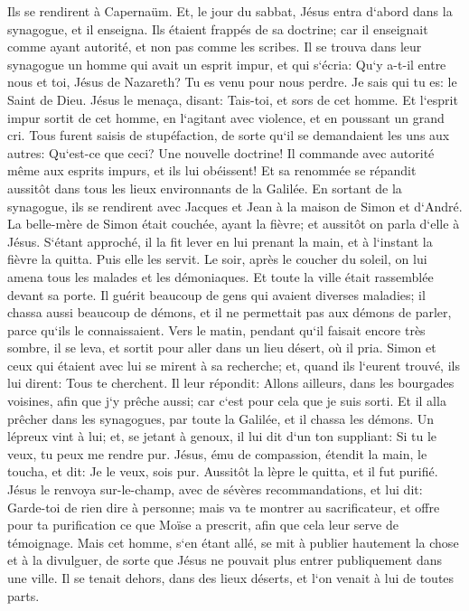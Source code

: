 \verse Ils se rendirent à Capernaüm. Et, le jour du sabbat, Jésus entra d`abord dans la synagogue, et il enseigna. 
\verse Ils étaient frappés de sa doctrine; car il enseignait comme ayant autorité, et non pas comme les scribes. 
\verse Il se trouva dans leur synagogue un homme qui avait un esprit impur, et qui s`écria: 
\verse Qu`y a-t-il entre nous et toi, Jésus de Nazareth? Tu es venu pour nous perdre. Je sais qui tu es: le Saint de Dieu. 
\verse Jésus le menaça, disant: Tais-toi, et sors de cet homme. 
\verse Et l`esprit impur sortit de cet homme, en l`agitant avec violence, et en poussant un grand cri. 
\verse Tous furent saisis de stupéfaction, de sorte qu`il se demandaient les uns aux autres: Qu`est-ce que ceci? Une nouvelle doctrine! Il commande avec autorité même aux esprits impurs, et ils lui obéissent! 
\verse Et sa renommée se répandit aussitôt dans tous les lieux environnants de la Galilée. 
\verse En sortant de la synagogue, ils se rendirent avec Jacques et Jean à la maison de Simon et d`André. 
\verse La belle-mère de Simon était couchée, ayant la fièvre; et aussitôt on parla d`elle à Jésus. 
\verse S`étant approché, il la fit lever en lui prenant la main, et à l`instant la fièvre la quitta. Puis elle les servit. 
\verse Le soir, après le coucher du soleil, on lui amena tous les malades et les démoniaques. 
\verse Et toute la ville était rassemblée devant sa porte. 
\verse Il guérit beaucoup de gens qui avaient diverses maladies; il chassa aussi beaucoup de démons, et il ne permettait pas aux démons de parler, parce qu`ils le connaissaient. 
\verse Vers le matin, pendant qu`il faisait encore très sombre, il se leva, et sortit pour aller dans un lieu désert, où il pria. 
\verse Simon et ceux qui étaient avec lui se mirent à sa recherche; 
\verse et, quand ils l`eurent trouvé, ils lui dirent: Tous te cherchent. 
\verse Il leur répondit: Allons ailleurs, dans les bourgades voisines, afin que j`y prêche aussi; car c`est pour cela que je suis sorti. 
\verse Et il alla prêcher dans les synagogues, par toute la Galilée, et il chassa les démons. 
\verse Un lépreux vint à lui; et, se jetant à genoux, il lui dit d`un ton suppliant: Si tu le veux, tu peux me rendre pur. 
\verse Jésus, ému de compassion, étendit la main, le toucha, et dit: Je le veux, sois pur. 
\verse Aussitôt la lèpre le quitta, et il fut purifié. 
\verse Jésus le renvoya sur-le-champ, avec de sévères recommandations, 
\verse et lui dit: Garde-toi de rien dire à personne; mais va te montrer au sacrificateur, et offre pour ta purification ce que Moïse a prescrit, afin que cela leur serve de témoignage. 
\verse Mais cet homme, s`en étant allé, se mit à publier hautement la chose et à la divulguer, de sorte que Jésus ne pouvait plus entrer publiquement dans une ville. Il se tenait dehors, dans des lieux déserts, et l`on venait à lui de toutes parts. 

